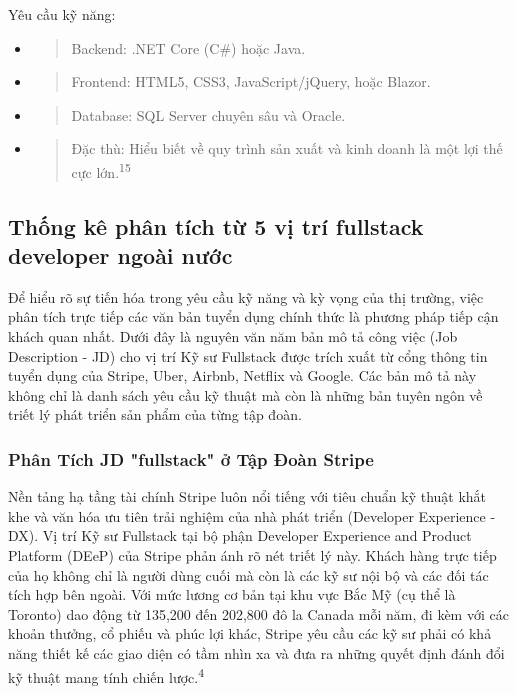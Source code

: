 \documentclass[12pt,a4paper]{article}
\begin{document}
Yêu cầu kỹ năng:
\begin{itemize}
\item
  \begin{quote}
  Backend: .NET Core (C\#) hoặc Java.
  \end{quote}
\item
  \begin{quote}
  Frontend: HTML5, CSS3, JavaScript/jQuery, hoặc Blazor.
  \end{quote}
\item
  \begin{quote}
  Database: SQL Server chuyên sâu và Oracle.
  \end{quote}
\item
  \begin{quote}
  Đặc thù: Hiểu biết về quy trình sản xuất và kinh doanh là một lợi thế cực lớn.\textsuperscript{15}
  \end{quote}
\end{itemize}

\subsection{Thống kê phân tích từ 5 vị trí fullstack developer ngoài nước}
Để hiểu rõ sự tiến hóa trong yêu cầu kỹ năng và kỳ vọng của thị trường, việc phân tích trực tiếp các văn bản tuyển dụng chính thức là phương pháp tiếp cận khách quan nhất. Dưới đây là nguyên văn năm bản mô tả công việc (Job Description - JD) cho vị trí Kỹ sư Fullstack được trích xuất từ cổng thông tin tuyển dụng của Stripe, Uber, Airbnb, Netflix và Google. Các bản mô tả này không chỉ là danh sách yêu cầu kỹ thuật mà còn là những bản tuyên ngôn về triết lý phát triển sản phẩm của từng tập đoàn.

\subsubsection{Phân Tích JD "fullstack" ở Tập Đoàn Stripe}

Nền tảng hạ tầng tài chính Stripe luôn nổi tiếng với tiêu chuẩn kỹ thuật khắt khe và văn hóa ưu tiên trải nghiệm của nhà phát triển (Developer Experience - DX). Vị trí Kỹ sư Fullstack tại bộ phận Developer Experience and Product Platform (DEeP) của Stripe phản ánh rõ nét triết lý này. Khách hàng trực tiếp của họ không chỉ là người dùng cuối mà còn là các kỹ sư nội bộ và các đối tác tích hợp bên ngoài. Với mức lương cơ bản tại khu vực Bắc Mỹ (cụ thể là Toronto) dao động từ 135,200 đến 202,800 đô la Canada mỗi năm, đi kèm với các khoản thưởng, cổ phiếu và phúc lợi khác, Stripe yêu cầu các kỹ sư phải có khả năng thiết kế các giao diện có tầm nhìn xa và đưa ra những quyết định đánh đổi kỹ thuật mang tính chiến lược.\textsuperscript{4}
\end{document}
